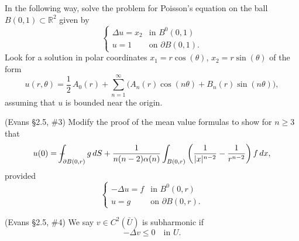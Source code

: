 \documentclass[12pt,fleqn]{exam}
\newcommand{\R}{\ensuremath{\mathbb{R}}}
\def\Xint#1{\mathchoice
	{\XXint\displaystyle\textstyle{#1}}%
	{\XXint\textstyle\scriptstyle{#1}}%
	{\XXint\scriptstyle\scriptscriptstyle{#1}}%
	{\XXint\scriptscriptstyle\scriptscriptstyle{#1}}%
\!\int}
\def\XXint#1#2#3{{\setbox0=\hbox{$#1{#2#3}{\int}$}
	\vcenter{\hbox{$#2#3$}}\kern-.5\wd0}}
\def\dashint{\Xint-}
\begin{document}
\begin{questions}

\question In the following way, solve the problem for Poisson's equation on the ball $B(0,1) \subset \R^2$ given by
\[\begin{cases}
\Delta u = x_2 & \text{in } B^0(0,1) \\
u = 1 & \text{on } \partial B(0,1).
\end{cases}\]
Look for a solution in polar coordinates $x_1 = r\cos(\theta)$, $x_2 = r\sin(\theta)$ of the form
\[u(r,\theta) = \frac12\,A_0(r) + \sum_{n = 1}^{\infty} \big( A_n(r)\cos(n\theta) + B_n(r)\sin(n\theta) \big),\]
assuming that $u$ is bounded near the origin.


\question (Evans \S2.5, \#3) Modify the proof of the mean value formulas to show for $n \geq 3$ that
\[u(0) = \dashint_{\partial B(0,r)} g\,dS + \frac{1}{n(n-2)\alpha(n)} \int_{B(0,r)} \bigg(\frac{1}{|x|^{n-2}} - \frac{1}{r^{n-2}}\bigg)\,f\,dx ,\]
provided
\[\begin{cases}
-\Delta u = f & \text{in } B^0(0,r) \\
u = g & \text{on } \partial B(0,r) .
\end{cases}\]

\question (Evans \S2.5, \#4) We say $v \in C^2(\bar{U})$ is subharmonic if
\[-\Delta v \leq 0 \quad\text{in } U.\]

\end{questions}
\end{document}
